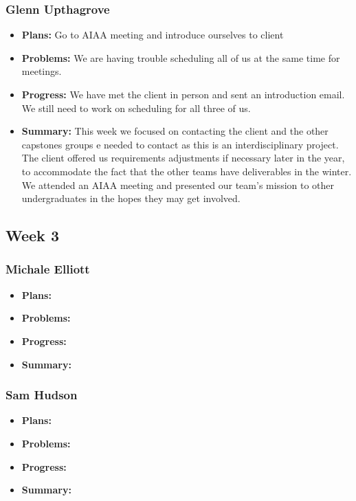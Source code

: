 \documentclass[onecolumn, draftclsnofoot,10pt, compsoc]{IEEEtran}
\begin{document}
\subsubsection{Glenn Upthagrove}
\begin {itemize}
 \item \textbf{Plans: }Go to AIAA meeting and introduce ourselves to client
 \item \textbf{Problems: }We are having trouble scheduling all of us at the same time for meetings.
 \item \textbf{Progress: }We have met the client in person and sent an introduction email. We still need to work on scheduling for all three of us. 
 \item \textbf{Summary: }This week we focused on contacting the client and the other capstones groups e needed to contact as this is an interdisciplinary project. The client offered us requirements adjustments if necessary later in the year, to accommodate the fact that the other teams have deliverables in the winter. We attended an AIAA meeting and presented our team's mission to other undergraduates in the hopes they may get involved. 
\end {itemize}
\subsection {Week 3}
\subsubsection{Michale Elliott}
\begin {itemize}
 \item \textbf{Plans: }
 \item \textbf{Problems: }
 \item \textbf{Progress: }
 \item \textbf{Summary: }
\end {itemize}
\subsubsection{Sam Hudson}
\begin {itemize}
 \item \textbf{Plans: }
 \item \textbf{Problems: }
 \item \textbf{Progress: }
 \item \textbf{Summary: }
\end {itemize}
\end{document}
